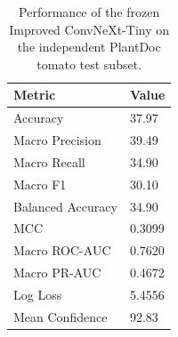 \begin{table}
\caption{Performance of the frozen Improved ConvNeXt-Tiny on the independent PlantDoc tomato test subset.}
\label{tab:external_plantdoc}
\begin{tabular}{ll}
\toprule
Metric & Value \\
\midrule
Accuracy & 37.97 \\
Macro Precision & 39.49 \\
Macro Recall & 34.90 \\
Macro F1 & 30.10 \\
Balanced Accuracy & 34.90 \\
MCC & 0.3099 \\
Macro ROC-AUC & 0.7620 \\
Macro PR-AUC & 0.4672 \\
Log Loss & 5.4556 \\
Mean Confidence & 92.83 \\
\bottomrule
\end{tabular}
\end{table}
